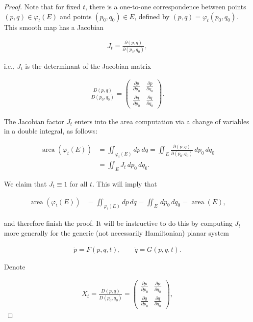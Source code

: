 \documentclass[11pt]{report}
\theoremstyle{plain}
\theoremstyle{definition}
\begin{document}
\begin{proof}
Note that for fixed $t$, there is a one-to-one
correspondence between points $(p,q) \in \varphi_t(E)$
and points $(p_0,q_0)\in E$, defined by
$(p,q)=\varphi_t(p_0,q_0)$. This smooth map has a
Jacobian

\begin{align*}
J_t = \frac{\partial (p,q)}{\partial (p_0,q_0)},
\end{align*}

\noindent i.e., $J_t$ is the determinant of the Jacobian matrix

\begin{align*}
\frac{D(p,q)}{D(p_0,q_0)} = \left(\begin{array}{cc}
\frac{\partial p}{\partial p_0} & \frac{\partial p}{\partial q_0} \\ \frac{\partial q}{\partial p_0} & \frac{\partial q}{\partial q_0}
\end{array}\right).
\end{align*}

\noindent The Jacobian factor $J_t$ enters into the area
computation via a change of variables in a double
integral, as follows:

\begin{align*}
\operatorname{area}(\varphi_t(E)) &= \iint_{\varphi_t(E)} dp\,dq
= \iint_E \frac{\partial (p,q)}{\partial (p_0,q_0)}\,dp_0\,dq_0 \\
&= \iint_E J_t \,dp_0\,dq_0.
\end{align*}

\noindent We claim that $J_t\equiv 1$ for all $t$. This will
imply that

\begin{align*}
\operatorname{area}(\varphi_t(E)) &= \iint_{\varphi_t(E)} dp\,dq
= \iint_E \,dp_0\,dq_0 = \operatorname{area}(E),
\end{align*}

\noindent and therefore finish the proof. It will be instructive
to do this by computing $J_t$ more generally for the
generic (not necessarily Hamiltonian) planar system

\begin{align*}
\dot{p} = F(p,q,t), \qquad
\dot{q} = G(p,q,t).
\end{align*}

\noindent Denote

\begin{align*}
X_t = \frac{D(p,q)}{D(p_0,q_0)} = \left(\begin{array}{cc}
\frac{\partial p}{\partial p_0} & \frac{\partial p}{\partial q_0} \\ \frac{\partial q}{\partial p_0} & \frac{\partial q}{\partial q_0}
\end{array}\right),
\end{align*}


\end{proof}
\end{document}
